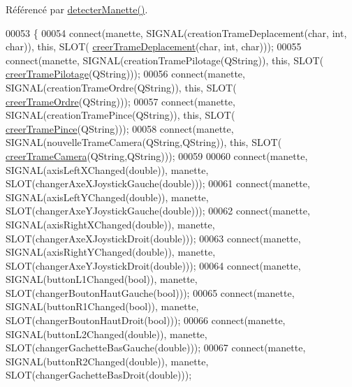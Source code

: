 Référencé par \hyperlink{rov_8cpp_source_l00029}{detecter\+Manette()}.


\begin{DoxyCode}
00053 \{
00054     connect(manette, SIGNAL(creationTrameDeplacement(\textcolor{keywordtype}{char}, \textcolor{keywordtype}{int}, \textcolor{keywordtype}{char})), \textcolor{keyword}{this}, SLOT(
      \hyperlink{class_rov_aa264d0723f6b491425ac2f85b933bab2}{creerTrameDeplacement}(\textcolor{keywordtype}{char}, \textcolor{keywordtype}{int}, \textcolor{keywordtype}{char})));
00055     connect(manette, SIGNAL(creationTramePilotage(QString)), \textcolor{keyword}{this}, SLOT(
      \hyperlink{class_rov_a97be62676ab0d57d5a8ac498147905ec}{creerTramePilotage}(QString)));
00056     connect(manette, SIGNAL(creationTrameOrdre(QString)), \textcolor{keyword}{this}, SLOT(
      \hyperlink{class_rov_a9e80eccfada890561e8af1f3426f6a2b}{creerTrameOrdre}(QString)));
00057     connect(manette, SIGNAL(creationTramePince(QString)), \textcolor{keyword}{this}, SLOT(
      \hyperlink{class_rov_a66be7f6ff6e20da160d55e0cd0605965}{creerTramePince}(QString)));
00058     connect(manette, SIGNAL(nouvelleTrameCamera(QString,QString)), \textcolor{keyword}{this}, SLOT(
      \hyperlink{class_rov_a204b1f4efe5a89f4458d84e17858e7c8}{creerTrameCamera}(QString,QString)));
00059 
00060     connect(manette, SIGNAL(axisLeftXChanged(\textcolor{keywordtype}{double})), manette, SLOT(changerAxeXJoystickGauche(\textcolor{keywordtype}{double})));
00061     connect(manette, SIGNAL(axisLeftYChanged(\textcolor{keywordtype}{double})), manette, SLOT(changerAxeYJoystickGauche(\textcolor{keywordtype}{double})));
00062     connect(manette, SIGNAL(axisRightXChanged(\textcolor{keywordtype}{double})), manette, SLOT(changerAxeXJoystickDroit(\textcolor{keywordtype}{double})));
00063     connect(manette, SIGNAL(axisRightYChanged(\textcolor{keywordtype}{double})), manette, SLOT(changerAxeYJoystickDroit(\textcolor{keywordtype}{double})));
00064     connect(manette, SIGNAL(buttonL1Changed(\textcolor{keywordtype}{bool})), manette, SLOT(changerBoutonHautGauche(\textcolor{keywordtype}{bool})));
00065     connect(manette, SIGNAL(buttonR1Changed(\textcolor{keywordtype}{bool})), manette, SLOT(changerBoutonHautDroit(\textcolor{keywordtype}{bool})));
00066     connect(manette, SIGNAL(buttonL2Changed(\textcolor{keywordtype}{double})), manette, SLOT(changerGachetteBasGauche(\textcolor{keywordtype}{double})));
00067     connect(manette, SIGNAL(buttonR2Changed(\textcolor{keywordtype}{double})), manette, SLOT(changerGachetteBasDroit(\textcolor{keywordtype}{double})));

\end{DoxyCode}
